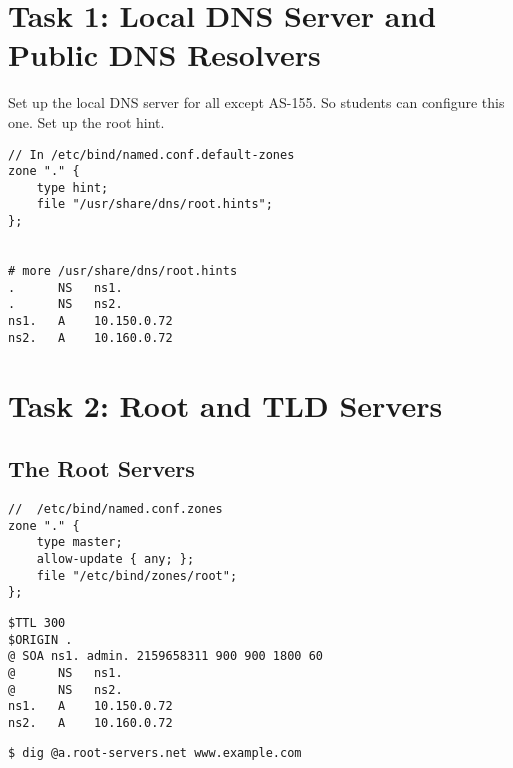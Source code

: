  

\section{Task 1: Local DNS Server and Public DNS Resolvers} 

Set up the local DNS server for all except AS-155.
So students can configure this one.
Set up the root hint.



\begin{lstlisting}
// In /etc/bind/named.conf.default-zones
zone "." {
	type hint;
	file "/usr/share/dns/root.hints";
};


# more /usr/share/dns/root.hints
.      NS   ns1.
.      NS   ns2.
ns1.   A    10.150.0.72
ns2.   A    10.160.0.72
\end{lstlisting}
 


\section{Task 2: Root and TLD Servers} 



\subsection{The Root Servers} 


\begin{lstlisting}
//  /etc/bind/named.conf.zones
zone "." { 
    type master; 
    allow-update { any; }; 
    file "/etc/bind/zones/root"; 
};
\end{lstlisting}
 

\begin{lstlisting}
$TTL 300
$ORIGIN .
@ SOA ns1. admin. 2159658311 900 900 1800 60
@      NS   ns1.
@      NS   ns2.
ns1.   A    10.150.0.72
ns2.   A    10.160.0.72
\end{lstlisting}
 


\begin{lstlisting}
$ dig @a.root-servers.net www.example.com
\end{lstlisting}
 




